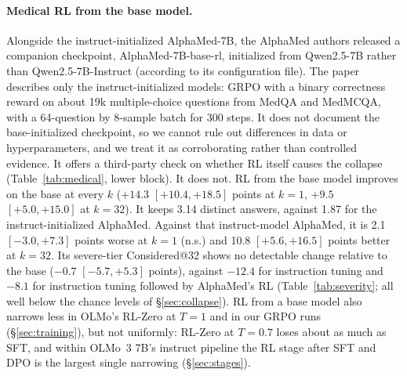 \documentclass[wcp]{jmlr}
\begin{document}
\paragraph{Medical RL from the base model.}
Alongside the instruct-initialized AlphaMed-7B, the AlphaMed authors released a companion checkpoint, AlphaMed-7B-base-rl, initialized from Qwen2.5-7B rather than Qwen2.5-7B-Instruct (according to its configuration file). The paper~\citep{liu2025alphamed} describes only the instruct-initialized models: GRPO with a binary correctness reward on about 19k multiple-choice questions from MedQA and MedMCQA, with a 64-question by 8-sample batch for 300 steps. It does not document the base-initialized checkpoint, so we cannot rule out differences in data or hyperparameters, and we treat it as corroborating rather than controlled evidence.
It offers a third-party check on whether RL itself causes the collapse (Table~\ref{tab:medical}, lower block).
It does not. RL from the base model improves on the base at every $k$ ($+14.3$ $[+10.4,+18.5]$ points at $k{=}1$, $+9.5$ $[+5.0,+15.0]$ at $k{=}32$). It keeps 3.14 distinct answers, against 1.87 for the instruct-initialized AlphaMed.
Against that instruct-model AlphaMed, it is 2.1 $[-3.0,+7.3]$ points worse at $k{=}1$ (n.s.) and 10.8 $[+5.6,+16.5]$ points better at $k{=}32$.
Its severe-tier Considered@32 shows no detectable change relative to the base ($-0.7$ $[-5.7,+5.3]$ points), against $-12.4$ for instruction tuning and $-8.1$ for instruction tuning followed by AlphaMed's RL (Table~\ref{tab:severity}; all well below the chance levels of \S\ref{sec:collapse}).
RL from a base model also narrows less in OLMo's RL-Zero at $T{=}1$ and in our GRPO runs (\S\ref{sec:training}), but not uniformly: RL-Zero at $T{=}0.7$ loses about as much as SFT, and within OLMo~3 7B's instruct pipeline the RL stage after SFT and DPO is the largest single narrowing (\S\ref{sec:stages}).
\end{document}
